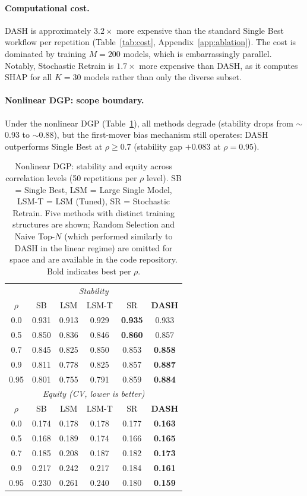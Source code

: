 \documentclass[11pt]{article}
\newcommand{\dash}{\textsc{DASH}}
\newcommand{\rhovar}{\rho}
\begin{document}
\paragraph{Computational cost.}
\dash{} is approximately $3.2\times$ more expensive than the standard
Single Best workflow per repetition (Table~\ref{tab:cost},
Appendix~\ref{app:ablation}). The cost is dominated by training
$M = 200$ models, which is embarrassingly parallel. Notably, Stochastic
Retrain is $1.7\times$ more expensive than \dash{}, as it computes SHAP
for all $K = 30$ models rather than only the diverse subset.

\paragraph{Nonlinear DGP: scope boundary.}
\label{sec:nonlinear}
Under the nonlinear DGP (Table~\ref{tab:nonlinear}), all methods
degrade (stability drops from $\sim$0.93 to $\sim$0.88), but the
first-mover bias mechanism still operates: \dash{} outperforms Single
Best at $\rhovar \geq 0.7$ (stability gap $+0.083$ at $\rhovar = 0.95$).

\begin{table}[htbp]
\centering
\caption{Nonlinear DGP: stability and equity across correlation levels
(50 repetitions per $\rhovar$ level).
SB = Single Best, LSM = Large Single Model, LSM-T = LSM (Tuned),
SR = Stochastic Retrain.
Five methods with distinct training structures are shown; Random Selection
and Naive Top-$N$ (which performed similarly to \dash{} in the linear regime)
are omitted for space and are available in the code repository.
Bold indicates best per $\rhovar$.}
\label{tab:nonlinear}
\begin{tabular}{cccccc}
\toprule
\multicolumn{6}{c}{\textit{Stability}} \\
$\rhovar$ & SB & LSM & LSM-T & SR & \textbf{DASH} \\
\midrule
0.0  & 0.931 & 0.913 & 0.929 & \textbf{0.935} & 0.933 \\
0.5  & 0.850 & 0.836 & 0.846 & \textbf{0.860} & 0.857 \\
0.7  & 0.845 & 0.825 & 0.850 & 0.853 & \textbf{0.858} \\
0.9  & 0.811 & 0.778 & 0.825 & 0.857 & \textbf{0.887} \\
0.95 & 0.801 & 0.755 & 0.791 & 0.859 & \textbf{0.884} \\
\midrule
\multicolumn{6}{c}{\textit{Equity (CV, lower is better)}} \\
$\rhovar$ & SB & LSM & LSM-T & SR & \textbf{DASH} \\
\midrule
0.0  & 0.174 & 0.178 & 0.178 & 0.177 & \textbf{0.163} \\
0.5  & 0.168 & 0.189 & 0.174 & 0.166 & \textbf{0.165} \\
0.7  & 0.185 & 0.208 & 0.187 & 0.182 & \textbf{0.173} \\
0.9  & 0.217 & 0.242 & 0.217 & 0.184 & \textbf{0.161} \\
0.95 & 0.230 & 0.261 & 0.240 & 0.180 & \textbf{0.159} \\
\bottomrule
\end{tabular}
\end{table}
\end{document}
